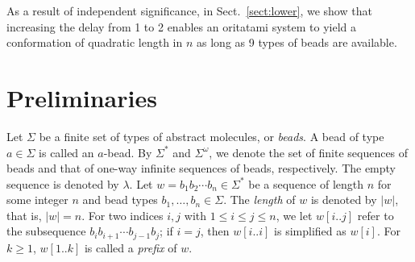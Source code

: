 \documentclass[runningheads]{llncs}
\begin{document}
As a result of independent significance, in Sect.~\ref{sect:lower}, we show that increasing the delay from 1 to 2 enables an oritatami system to yield a conformation of quadratic length in $n$ as long as 9 types of beads are available. 

	\section{Preliminaries}\label{sec:preliminaries}

Let $\Sigma$ be a finite set of types of abstract molecules, or \textit{beads}. 
A bead of type $a \in \Sigma$ is called an $a$-bead. 
By $\Sigma^*$ and $\Sigma^\omega$, we denote the set of finite sequences of beads and that of one-way infinite sequences of beads, respectively. 
The empty sequence is denoted by $\lambda$. 
Let $w = b_1 b_2 \cdots b_n \in \Sigma^*$ be a sequence of length $n$ for some integer $n$ and bead types $b_1, \ldots, b_n \in \Sigma$. 
The \textit{length} of $w$ is denoted by $|w|$, that is, $|w| = n$. 
For two indices $i, j$ with $1 \le i \le j \le n$, we let $w[i..j]$ refer to the subsequence $b_i b_{i+1} \cdots b_{j-1}b_j$; if $i = j$, then $w[i..i]$ is simplified as $w[i]$. 
For $k \ge 1$, $w[1..k]$ is called a \textit{prefix} of $w$. 
\end{document}
